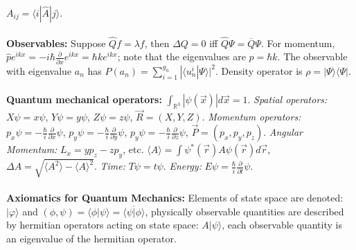 $A_{ij}=  \langle i | \hat {A} |j \rangle $.
\\
\\
{\bf Observables:}  
Suppose
${\hat Q} f = \lambda f$, then $\Delta Q= 0$ iff ${\hat Q} \Psi= {\overline Q} \Psi$.  For
momentum, 
${\hat p} e^{ikx} = - i \hbar {\frac {\partial} {\partial x}} e^{ikx}= \hbar k e^{ikx}$;
note that the eigenvalues are $p= \hbar k$.
The observable with eigenvalue $a_n$ has 
$P(a_n) = \sum_{i=1}^{g_n} | \langle u_n^i | \Psi \rangle|^2$.
Density operator is $\rho= | \Psi \rangle  \langle \Psi|$.
\\
\\
{\bf Quantum mechanical operators:}
$\int_{{\mathbb R}^3} |\psi({\vec x})| d{\vec x}= 1$.
\emph{Spatial operators:}
$X \psi= x \psi$,
$Y \psi= y \psi$,
$Z \psi= z \psi$, ${\vec R}= (X,Y,Z)$.
\emph{Momentum operators:}
$p_x \psi= -{\frac {\hbar} {i}} {\frac {\partial} {\partial x}} \psi$,
$p_y \psi= -{\frac {\hbar} {i}} {\frac {\partial} {\partial y}} \psi$,
$p_y \psi= -{\frac {\hbar} {i}} {\frac {\partial} {\partial z}} \psi$,
${\vec P}= (p_x, p_y, p_z)$.
\emph{Angular Momentum:} $L_x=yp_z-zp_y$, etc.
$ \langle A \rangle = \int \psi^*({\vec r}) A \psi({\vec r}) d {\vec r}$,
$\Delta A= {\sqrt { \langle A^2 \rangle - \langle A \rangle ^2}}$.
\emph{Time:} 
$T \psi = t \psi $.
\emph{Energy:}
$E \psi= {\frac {\hbar} {i}} {\frac {\partial} {\partial t}} \psi$.
\\
\\
{\bf Axiomatics for Quantum Mechanics:}
Elements of state space are denoted: $|\varphi \rangle $ and 
$(\phi, \psi)=  \langle \phi | \psi \rangle =
{\overline {\langle \psi | \phi \rangle }} $,
physically observable quantities are described by hermitian operators acting on state space:
$A | \psi \rangle $, each observable quantity is an eigenvalue of the hermitian operator. 
